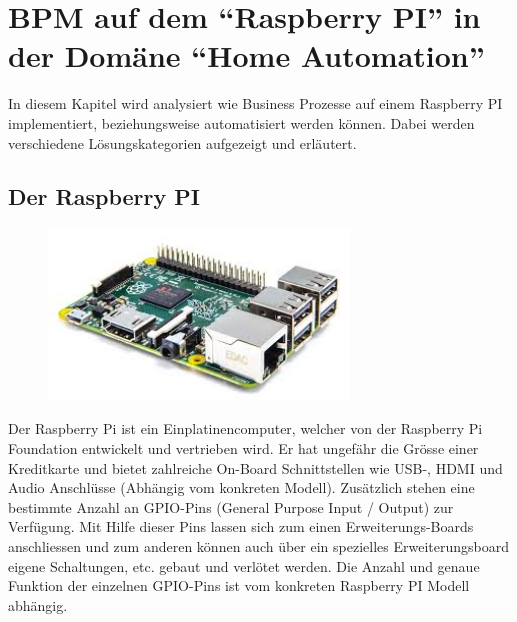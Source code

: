 
\chapter{BPM auf dem "`Raspberry PI"' in der Domäne "`Home Automation"'}
In diesem Kapitel wird analysiert wie Business Prozesse auf einem Raspberry PI implementiert, beziehungsweise automatisiert werden können. Dabei werden verschiedene Lösungskategorien aufgezeigt und erläutert.


\section{Der Raspberry PI}
\begin{figure}
  \centering
  \includegraphics[width=8cm]{./images/RaspberryPi2ModelB}
\end{figure}
  
Der Raspberry Pi ist ein Einplatinencomputer, welcher von der Raspberry Pi Foundation entwickelt und vertrieben wird. Er hat ungefähr die Grösse einer Kreditkarte und bietet zahlreiche On-Board Schnittstellen wie USB-, HDMI und Audio Anschlüsse (Abhängig vom konkreten Modell). Zusätzlich stehen eine bestimmte Anzahl an GPIO-Pins (General Purpose Input / Output) zur Verfügung. Mit Hilfe dieser Pins lassen sich zum einen Erweiterungs-Boards anschliessen und zum anderen können auch über ein spezielles Erweiterungsboard eigene Schaltungen, etc. gebaut und verlötet werden. Die Anzahl und genaue Funktion der einzelnen GPIO-Pins ist vom konkreten Raspberry PI Modell abhängig.

